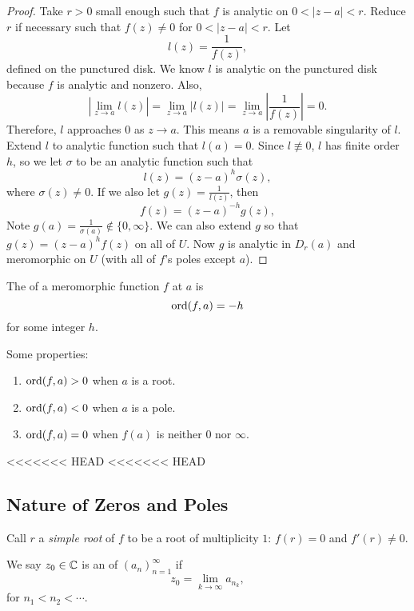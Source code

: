 \documentclass[notes]{subfile}
\begin{document}
\begin{proof}
    Take $r > 0$ small enough such that $f$ is analytic
    on $0 < |z-a| < r$.
    Reduce $r$ if necessary such that $f(z) \ne 0$ for
    $0 < |z-a| < r$.
    Let 
    \[ l(z) = \frac{1}{f(z)}, \]
    defined on the punctured disk.  
    We know $l$ is analytic on the punctured disk because
    $f$ is analytic and nonzero.
    Also,
    \[ \left| \lim_{z \to a} l(z) \right|
        = \lim_{z \to a} |l(z)|
        = \lim_{z \to a} \left| \frac{1}{f(z)}\right|
        = 0.
    \]
    Therefore, $l$ approaches $0$ as $z \to a$.
    This means $a$ is a removable singularity of $l$.
    Extend $l$ to analytic function such that $l(a) = 0$.
    Since $l \nequiv 0$, $l$ has finite order $h$, so we
    let $\sigma$ to be an analytic function such that
    \[ l(z) = (z-a)^h \sigma(z), \]
    where $\sigma(z) \ne 0$.
    If we also let $g(z) = \frac{1}{l(z)}$, then
    \[ f(z) = (z-a)^{-h} g(z), \]
    Note $g(a) = \frac{1}{\sigma(a)} \notin \{0, \infty \}$.
    We can also extend $g$ so that $g(z) = (z-a)^hf(z)$ 
    on all of $U$.
    Now $g$ is analytic in $D_r(a)$ and meromorphic on $U$
    (with all of $f$'s poles except $a$).
\end{proof}

\begin{definition}
    The  of a meromorphic function $f$ at 
    $a$ is 
    \[ \operatorname{ord}(f, a) = -h \]
    for some integer $h$.
\end{definition}

Some properties:
\begin{enumerate}
    \item $\operatorname{ord}(f, a) > 0$ when $a$ is a root.
    \item $\operatorname{ord}(f, a) < 0$ when $a$ is a pole.
    \item $\operatorname{ord}(f, a) = 0$ when $f(a)$ is neither $0$ nor
        $\infty$.
\end{enumerate}

<<<<<<< HEAD
<<<<<<< HEAD
\subsection{Nature of Zeros and Poles}

Call $r$ a \emph{simple root} of $f$ to be a root of 
multiplicity $1$: $f(r) = 0$ and $f'(r) \ne 0$.

\begin{definition}
    We say $z_0 \in \operatorname{\mathbb{C}}$ is an  of 
    $(a_n)_{n=1}^{\infty}$ if
    \[ z_0 = \lim_{k \to \infty} a_{n_k}, \]
    for $n_1 < n_2 < \cdots$.
\end{definition}
\end{document}
